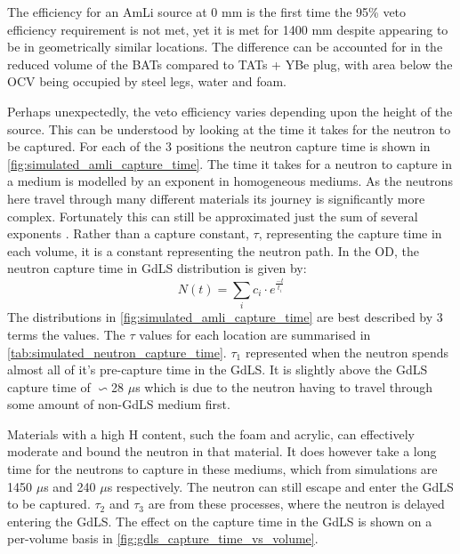 \par
The efficiency for an AmLi source at 0 mm is the first time the 95\% veto efficiency requirement is not met, yet it is met for 1400 mm despite appearing to be in geometrically similar locations.
The difference can be accounted for in the reduced volume of the BATs compared to TATs + YBe plug, with area below the OCV being occupied by steel legs, water and foam.

\par
Perhaps unexpectedly, the veto efficiency varies depending upon the height of the source.
This can be understood by looking at the time it takes for the neutron to be captured.
For each of the 3 positions the neutron capture time is shown in \autoref{fig:simulated_amli_capture_time}.
The time it takes for a neutron to capture in a medium is modelled by an exponent in homogeneous mediums.
As the neutrons here travel through many different materials its journey is significantly more complex.
Fortunately this can still be approximated just the sum of several exponents \cite{Dayabay_neutron_capture_fit_ref}.
Rather than a capture constant, $\tau$, representing the capture time in each volume, it is a constant representing the neutron path.
In the OD, the neutron capture time in GdLS distribution is given by:
\begin{equation}
    N(t) = \sum_{i} c_i \cdot e^{\frac{-t}{t_i}}
\label{eq:neutron_capture_time}
\end{equation}
The distributions in \autoref{fig:simulated_amli_capture_time} are best described by 3 terms the values.
The $\tau$ values for each location are summarised in \autoref{tab:simulated_neutron_capture_time}.
$\tau_1$ represented when the neutron spends almost all of it's pre-capture time in the GdLS.
It is slightly above the GdLS capture time of $\backsim$28 $\mu$s \cite{ucsb_gdls_dicebox_simulations_ref} which is due to the neutron having to travel through some amount of non-GdLS medium first.
\par
Materials with a high H content, such the foam and acrylic, can effectively moderate and bound the neutron in that material.
It does however take a long time for the neutrons to capture in these mediums, which from simulations are 1450 $\mu$s and 240 $\mu$s respectively.
The neutron can still escape and enter the GdLS to be captured.
$\tau_2$ and $\tau_3$ are from these processes, where the neutron is delayed entering the GdLS.
The effect on the capture time in the GdLS is shown on a per-volume basis in \autoref{fig:gdls_capture_time_vs_volume}.

